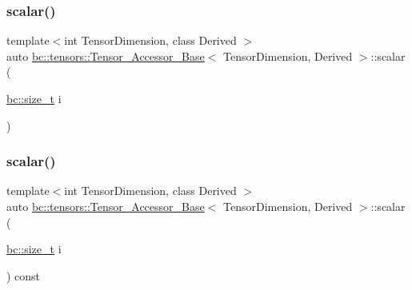 \mbox{\label{classbc_1_1tensors_1_1Tensor__Accessor__Base_a94673405343bb76655fbba416ec53f3e}} 
\subsubsection{\texorpdfstring{scalar()}{scalar()}\hspace{0.1cm}{\footnotesize\ttfamily [1/2]}}
{\footnotesize\ttfamily template$<$int Tensor\+Dimension, class Derived $>$ \\
auto \hyperlink{classbc_1_1tensors_1_1Tensor__Accessor__Base}{bc\+::tensors\+::\+Tensor\+\_\+\+Accessor\+\_\+\+Base}$<$ Tensor\+Dimension, Derived $>$\+::scalar (\begin{DoxyParamCaption}\item[{\hyperlink{namespacebc_aaf8e3fbf99b04b1b57c4f80c6f55d3c5}{bc\+::size\+\_\+t}}]{i }\end{DoxyParamCaption})\hspace{0.3cm}{\ttfamily [inline]}}

\mbox{\label{classbc_1_1tensors_1_1Tensor__Accessor__Base_ae33a59b508f009a9d252532328bc1e9b}} 
\subsubsection{\texorpdfstring{scalar()}{scalar()}\hspace{0.1cm}{\footnotesize\ttfamily [2/2]}}
{\footnotesize\ttfamily template$<$int Tensor\+Dimension, class Derived $>$ \\
auto \hyperlink{classbc_1_1tensors_1_1Tensor__Accessor__Base}{bc\+::tensors\+::\+Tensor\+\_\+\+Accessor\+\_\+\+Base}$<$ Tensor\+Dimension, Derived $>$\+::scalar (\begin{DoxyParamCaption}\item[{\hyperlink{namespacebc_aaf8e3fbf99b04b1b57c4f80c6f55d3c5}{bc\+::size\+\_\+t}}]{i }\end{DoxyParamCaption}) const\hspace{0.3cm}{\ttfamily [inline]}}

